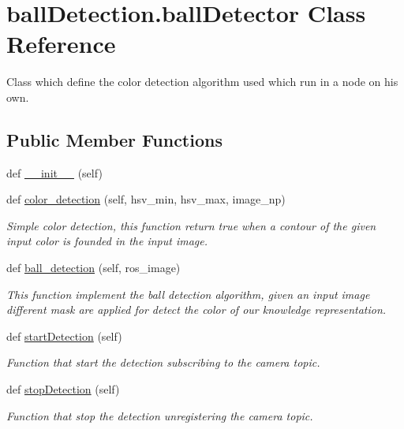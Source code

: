 \hypertarget{classballDetection_1_1ballDetector}{}\section{ball\+Detection.\+ball\+Detector Class Reference}
\label{classballDetection_1_1ballDetector}


Class which define the color detection algorithm used which run in a node on his own.  


\subsection*{Public Member Functions}
\begin{DoxyCompactItemize}
\item 
def \hyperlink{classballDetection_1_1ballDetector_ac87f218abdb03da0143f113695dca5d5}{\+\_\+\+\_\+init\+\_\+\+\_\+} (self)
\item 
def \hyperlink{classballDetection_1_1ballDetector_ada73fa6d070ed2c2be489e7c89c1b6c0}{color\+\_\+detection} (self, hsv\+\_\+min, hsv\+\_\+max, image\+\_\+np)
\begin{DoxyCompactList}\small\item\em Simple color detection, this function return true when a contour of the given input color is founded in the input image. \end{DoxyCompactList}\item 
def \hyperlink{classballDetection_1_1ballDetector_a62a5e77b3c5af1b96c70b2e5037ce4c6}{ball\+\_\+detection} (self, ros\+\_\+image)
\begin{DoxyCompactList}\small\item\em This function implement the ball detection algorithm, given an input image different mask are applied for detect the color of our knowledge representation. \end{DoxyCompactList}\item 
def \hyperlink{classballDetection_1_1ballDetector_a852941442c83f3160bb2cac307f495dc}{start\+Detection} (self)
\begin{DoxyCompactList}\small\item\em Function that start the detection subscribing to the camera topic. \end{DoxyCompactList}\item 
def \hyperlink{classballDetection_1_1ballDetector_ab146dd9d22b2b5eea5103e56181e51c4}{stop\+Detection} (self)
\begin{DoxyCompactList}\small\item\em Function that stop the detection unregistering the camera topic. \end{DoxyCompactList}\end{DoxyCompactItemize}
